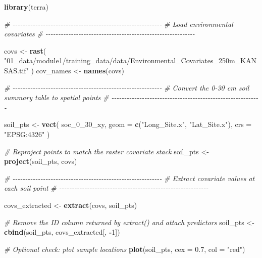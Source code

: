 \documentclass[
  10pt,
  b5paper,
  oneside]{book}
\newenvironment{Shaded}{\begin{snugshade}}{\end{snugshade}}
\newcommand{\AttributeTok}[1]{\textcolor[rgb]{0.13,0.29,0.53}{#1}}
\newcommand{\CommentTok}[1]{\textcolor[rgb]{0.56,0.35,0.01}{\textit{#1}}}
\newcommand{\DecValTok}[1]{\textcolor[rgb]{0.00,0.00,0.81}{#1}}
\newcommand{\FloatTok}[1]{\textcolor[rgb]{0.00,0.00,0.81}{#1}}
\newcommand{\FunctionTok}[1]{\textcolor[rgb]{0.13,0.29,0.53}{\textbf{#1}}}
\newcommand{\NormalTok}[1]{#1}
\newcommand{\OtherTok}[1]{\textcolor[rgb]{0.56,0.35,0.01}{#1}}
\newcommand{\SpecialCharTok}[1]{\textcolor[rgb]{0.81,0.36,0.00}{\textbf{#1}}}
\newcommand{\StringTok}[1]{\textcolor[rgb]{0.31,0.60,0.02}{#1}}
\begin{document}
\begin{Shaded}
\begin{Highlighting}[]
\FunctionTok{library}\NormalTok{(terra)}

\CommentTok{\# {-}{-}{-}{-}{-}{-}{-}{-}{-}{-}{-}{-}{-}{-}{-}{-}{-}{-}{-}{-}{-}{-}{-}{-}{-}{-}{-}{-}{-}{-}{-}{-}{-}{-}{-}{-}{-}{-}{-}{-}{-}{-}{-}{-}{-}{-}{-}{-}{-}{-}{-}{-}{-}{-}{-}{-}{-}{-}{-}}
\CommentTok{\# Load environmental covariates}
\CommentTok{\# {-}{-}{-}{-}{-}{-}{-}{-}{-}{-}{-}{-}{-}{-}{-}{-}{-}{-}{-}{-}{-}{-}{-}{-}{-}{-}{-}{-}{-}{-}{-}{-}{-}{-}{-}{-}{-}{-}{-}{-}{-}{-}{-}{-}{-}{-}{-}{-}{-}{-}{-}{-}{-}{-}{-}{-}{-}{-}{-}}

\NormalTok{covs }\OtherTok{\textless{}{-}} \FunctionTok{rast}\NormalTok{(}
  \StringTok{"01\_data/module1/training\_data/data/Environmental\_Covariates\_250m\_KANSAS.tif"}
\NormalTok{)}
\NormalTok{cov\_names }\OtherTok{\textless{}{-}} \FunctionTok{names}\NormalTok{(covs)}

\CommentTok{\# {-}{-}{-}{-}{-}{-}{-}{-}{-}{-}{-}{-}{-}{-}{-}{-}{-}{-}{-}{-}{-}{-}{-}{-}{-}{-}{-}{-}{-}{-}{-}{-}{-}{-}{-}{-}{-}{-}{-}{-}{-}{-}{-}{-}{-}{-}{-}{-}{-}{-}{-}{-}{-}{-}{-}{-}{-}{-}{-}}
\CommentTok{\# Convert the 0{-}30 cm soil summary table to spatial points}
\CommentTok{\# {-}{-}{-}{-}{-}{-}{-}{-}{-}{-}{-}{-}{-}{-}{-}{-}{-}{-}{-}{-}{-}{-}{-}{-}{-}{-}{-}{-}{-}{-}{-}{-}{-}{-}{-}{-}{-}{-}{-}{-}{-}{-}{-}{-}{-}{-}{-}{-}{-}{-}{-}{-}{-}{-}{-}{-}{-}{-}{-}}

\NormalTok{soil\_pts }\OtherTok{\textless{}{-}} \FunctionTok{vect}\NormalTok{(}
\NormalTok{  soc\_0\_30\_xy,}
  \AttributeTok{geom =} \FunctionTok{c}\NormalTok{(}\StringTok{"Long\_Site.x"}\NormalTok{, }\StringTok{"Lat\_Site.x"}\NormalTok{),}
  \AttributeTok{crs =} \StringTok{"EPSG:4326"}
\NormalTok{)}

\CommentTok{\# Reproject points to match the raster covariate stack}
\NormalTok{soil\_pts }\OtherTok{\textless{}{-}} \FunctionTok{project}\NormalTok{(soil\_pts, covs)}

\CommentTok{\# {-}{-}{-}{-}{-}{-}{-}{-}{-}{-}{-}{-}{-}{-}{-}{-}{-}{-}{-}{-}{-}{-}{-}{-}{-}{-}{-}{-}{-}{-}{-}{-}{-}{-}{-}{-}{-}{-}{-}{-}{-}{-}{-}{-}{-}{-}{-}{-}{-}{-}{-}{-}{-}{-}{-}{-}{-}{-}{-}}
\CommentTok{\# Extract covariate values at each soil point}
\CommentTok{\# {-}{-}{-}{-}{-}{-}{-}{-}{-}{-}{-}{-}{-}{-}{-}{-}{-}{-}{-}{-}{-}{-}{-}{-}{-}{-}{-}{-}{-}{-}{-}{-}{-}{-}{-}{-}{-}{-}{-}{-}{-}{-}{-}{-}{-}{-}{-}{-}{-}{-}{-}{-}{-}{-}{-}{-}{-}{-}{-}}

\NormalTok{covs\_extracted }\OtherTok{\textless{}{-}} \FunctionTok{extract}\NormalTok{(covs, soil\_pts)}

\CommentTok{\# Remove the ID column returned by extract() and attach predictors}
\NormalTok{soil\_pts }\OtherTok{\textless{}{-}} \FunctionTok{cbind}\NormalTok{(soil\_pts, covs\_extracted[, }\SpecialCharTok{{-}}\DecValTok{1}\NormalTok{])}

\CommentTok{\# Optional check: plot sample locations}
\FunctionTok{plot}\NormalTok{(soil\_pts, }\AttributeTok{cex =} \FloatTok{0.7}\NormalTok{, }\AttributeTok{col =} \StringTok{"red"}\NormalTok{)}
\end{Highlighting}
\end{Shaded}
\end{document}
